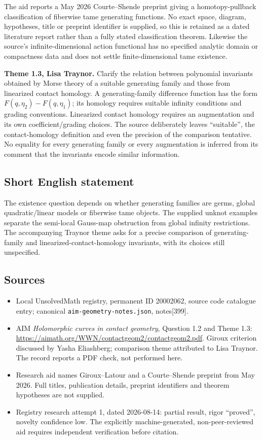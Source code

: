 \documentclass[11pt]{article}
\begin{document}
The aid reports a May 2026 Courte--Shende preprint giving a homotopy-pullback classification of fiberwise tame generating functions. No exact space, diagram, hypotheses, title or preprint identifier is supplied, so this is retained as a dated literature report rather than a fully stated classification theorem. Likewise the source's infinite-dimensional action functional has no specified analytic domain or compactness data and does not settle finite-dimensional tame existence.

\textbf{Theme 1.3, Lisa Traynor.} Clarify the relation between polynomial invariants obtained by Morse theory of a suitable generating family and those from linearized contact homology. A generating-family difference function has the form $F(q,\eta_2)-F(q,\eta_1)$; its homology requires suitable infinity conditions and grading conventions. Linearized contact homology requires an augmentation and its own coefficient/grading choices. The source deliberately leaves ``suitable'', the contact-homology definition and even the precision of the comparison tentative. No equality for every generating family or every augmentation is inferred from its comment that the invariants encode similar information.
\subsection{Short English statement}
The existence question depends on whether generating families are germs, global quadratic/linear models or fiberwise tame objects. The supplied unknot examples separate the semi-local Gauss-map obstruction from global infinity restrictions. The accompanying Traynor theme asks for a precise comparison of generating-family and linearized-contact-homology invariants, with its choices still unspecified.
\subsection{Sources}
\begin{itemize}
\item Local UnsolvedMath registry, permanent ID 20002062, source code catalogue entry; canonical \texttt{aim-geometry-notes.json}, notes[399].
\item AIM \emph{Holomorphic curves in contact geometry}, Question 1.2 and Theme 1.3: \url{https://aimath.org/WWN/contactgeom2/contactgeom2.pdf}. Giroux criterion discussed by Yasha Eliashberg; comparison theme attributed to Lisa Traynor. The record reports a PDF check, not performed here.
\item Research aid names Giroux--Latour and a Courte--Shende preprint from May 2026. Full titles, publication details, preprint identifiers and theorem hypotheses are not supplied.
\item Registry research attempt 1, dated 2026-08-14: partial result, rigor ``proved'', novelty confidence low. The explicitly machine-generated, non-peer-reviewed aid requires independent verification before citation.
\end{itemize}
\end{document}

